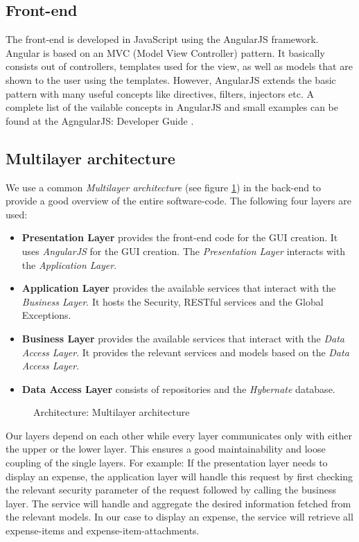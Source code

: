 \subsection{Front-end}
The front-end is developed in JavaScript using the AngularJS \cite{angular} framework. Angular is based on an MVC (Model View Controller) pattern. It basically consists out of controllers, templates used for the view, as well as models that are shown to the user using the templates. However, AngularJS \cite{angular} extends the basic pattern with many useful concepts like directives, filters, injectors etc. A complete list of the vailable concepts in AngularJS and small examples can be found at the AgngularJS: Developer Guide \cite{angular-devguide}.   

\subsection{Multilayer architecture}
We use a common \textit{Multilayer architecture} (see figure \ref{fig:architecture-layer}) in the back-end to provide a good overview of the entire software-code. The following four layers are used:
\begin{itemize}
    \item \textbf{Presentation Layer} provides the front-end code for the GUI creation. It uses \textit{AngularJS} for the GUI creation. The \textit{Presentation Layer} interacts with the \textit{Application Layer}.
    \item \textbf{Application Layer} provides the available services that interact with the \textit{Business Layer}. It hosts the Security, RESTful services and the Global Exceptions.
    \item \textbf{Business Layer} provides the available services that interact with the \textit{Data Access Layer}. It provides the relevant services and models based on the \textit{Data Access Layer}.
    \item \textbf{Data Access Layer} consists of repositories and the \textit{Hybernate} database. 
\end{itemize}

\begin{figure}[H]
    \centering
    \caption{Architecture: Multilayer architecture}
    \label{fig:architecture-layer}
\end{figure}

Our layers depend on each other while every layer communicates only with either the upper or the lower layer. This ensures a good maintainability and loose coupling of the single layers.\newline 
For example: If the presentation layer needs to display an expense, the application layer will handle this request by first checking the relevant security parameter of the request followed by calling the business layer. The service will handle and aggregate the desired information fetched from the relevant models. In our case to display an expense, the service will retrieve all expense-items and expense-item-attachments.


